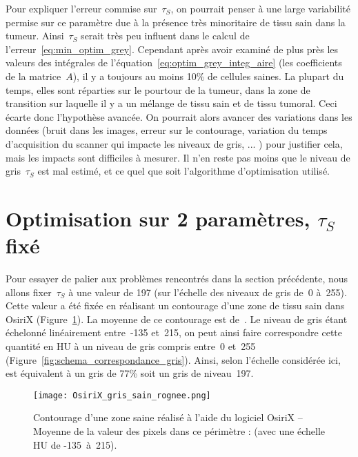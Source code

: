 \documentclass[main.tex]{subfiles}
\begin{document}
Pour expliquer l'erreur commise sur~$\tau_S$, on pourrait penser à une large variabilité permise sur ce paramètre due à la présence très minoritaire de tissu  sain dans la tumeur. Ainsi~$\tau_S$ serait très peu influent dans le calcul de l'erreur~\eqref{eq:min_optim_grey}. Cependant après avoir examiné de plus près les valeurs des intégrales de l'équation~\eqref{eq:optim_grey_integ_aire} (\ie les coefficients de la matrice~$A$), il y a toujours au moins 10\% de cellules saines. La plupart du temps, elles sont réparties sur le pourtour de la tumeur, dans la zone de transition sur laquelle il y a un mélange de tissu sain et de tissu tumoral. Ceci écarte donc l'hypothèse avancée. On pourrait alors avancer des variations dans les données (bruit dans les images, erreur sur le contourage, variation du temps d'acquisition du scanner qui impacte les niveaux de gris, ... ) pour justifier cela, mais les impacts sont difficiles à mesurer. 
Il n'en reste pas moins que le niveau de gris~$\tau_S$ est mal estimé, et ce quel que soit l'algorithme d'optimisation utilisé. 


\section{Optimisation sur 2 paramètres, $\tau_S$ fixé \label{sec:optim_2_param}}
Pour essayer de palier aux problèmes rencontrés dans la section précédente, nous allons fixer~$\tau_S$ à une valeur de 197 (sur l'échelle des niveaux de gris de~0 à~255). Cette valeur a été fixée en réalisant un contourage d'une zone de tissu sain dans OsiriX (\cf  Figure~\ref{fig:contourage_sain}). La moyenne de ce contourage est de~. Le niveau de gris étant échelonné linéairement entre~-135 et~215, on peut ainsi faire correspondre cette quantité en HU à un niveau de gris compris entre~0 et~255 (\cf Figure~\ref{fig:schema_correspondance_gris}). Ainsi, selon l'échelle considérée ici,  est  équivalent à un gris de 77\% soit un gris de niveau~197.


\begin{figure}
\texttt{[image: OsiriX\_gris\_sain\_rognee.png]}
\caption{\label{fig:contourage_sain}Contourage d'une zone saine réalisé à l'aide du logiciel OsiriX -- Moyenne de la valeur des pixels dans ce périmètre :  (avec une échelle HU de \mbox{-135 à 215}).}
\end{figure}
\end{document}
